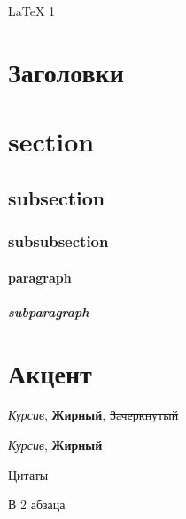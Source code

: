 

\renewcommand{\copyright}{pluttan, fixii}
    
    
\LaTeX{} 
1

\section{\textbf{Заголовки}}
\section{section}
\subsection{subsection}
\subsubsection{subsubsection}
\paragraph{paragraph}
\subparagraph{subparagraph}
\section{\textbf{Акцент}}

\textit{Курсив}, \textbf{Жирный}, \sout{Зачеркнутый}

\textit{Курсив}, \textbf{Жирный}
\begin{mainQuote}

Цитаты

В 2 абзаца
\end{mainQuote}
